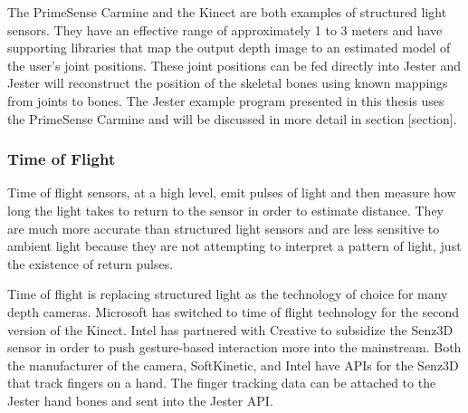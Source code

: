 The PrimeSense Carmine and the Kinect are both examples of structured light sensors. They have an effective range of approximately 1 to 3 meters and have supporting libraries that map the output depth image to an estimated model of the user’s joint positions. These joint positions can be fed directly into Jester and Jester will reconstruct the position of the skeletal bones using known mappings from joints to bones. The Jester example program presented in this thesis uses the PrimeSense Carmine and will be discussed in more detail in section [section].

\subsubsection{Time of Flight}

Time of flight sensors, at a high level, emit pulses of light and then measure how long the light takes to return to the sensor in order to estimate distance. They are much more accurate than structured light sensors and are less sensitive to ambient light because they are not attempting to interpret a pattern of light, just the existence of return pulses. 

Time of flight is replacing structured light as the technology of choice for many depth cameras. Microsoft has switched to time of flight technology for the second version of the Kinect. Intel has partnered with Creative to subsidize the Senz3D sensor in order to push gesture-based interaction more into the mainstream. Both the manufacturer of the camera, SoftKinetic, and Intel have APIs for the Senz3D that track fingers on a hand. The finger tracking data can be attached to the Jester hand bones and sent into the Jester API.